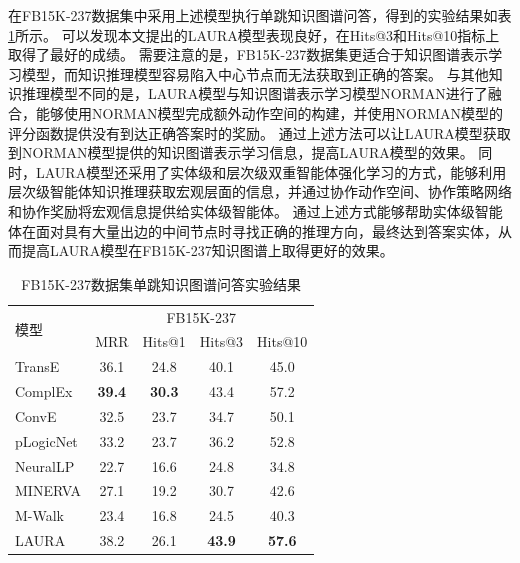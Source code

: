 \documentclass[algorithmlist, AutoFakeBold, AutoFakeSlant, figurelist, tablelist, nomlist, engineering]{seuthesix}
\begin{document}
在FB15K-237数据集中采用上述模型执行单跳知识图谱问答，得到的实验结果如表\ref{Experiment2_FB15K-237}所示。
可以发现本文提出的LAURA模型表现良好，在Hits@3和Hits@10指标上取得了最好的成绩。
需要注意的是，FB15K-237数据集更适合于知识图谱表示学习模型，而知识推理模型容易陷入中心节点而无法获取到正确的答案。
与其他知识推理模型不同的是，LAURA模型与知识图谱表示学习模型NORMAN进行了融合，能够使用NORMAN模型完成额外动作空间的构建，并使用NORMAN模型的评分函数提供没有到达正确答案时的奖励。
通过上述方法可以让LAURA模型获取到NORMAN模型提供的知识图谱表示学习信息，提高LAURA模型的效果。
同时，LAURA模型还采用了实体级和层次级双重智能体强化学习的方式，能够利用层次级智能体知识推理获取宏观层面的信息，并通过协作动作空间、协作策略网络和协作奖励将宏观信息提供给实体级智能体。
通过上述方式能够帮助实体级智能体在面对具有大量出边的中间节点时寻找正确的推理方向，最终达到答案实体，从而提高LAURA模型在FB15K-237知识图谱上取得更好的效果。
\begin{table}[]
  \centering
  \begin{tabular*}{0.95\textwidth}{@{\extracolsep{\fill}}lcccc}
  \toprule[1pt]
  \multirow{2}{*}{模型} & \multicolumn{4}{c}{FB15K-237}   \\
    & MRR & Hits@1 & Hits@3 & Hits@10 \\ \hline
  TransE & 36.1 & 24.8 & 40.1 & 45.0 \\
  ComplEx & \textbf{39.4} & \textbf{30.3} & 43.4 & 57.2 \\
  ConvE & 32.5 & 23.7 & 34.7 & 50.1 \\
  pLogicNet & 33.2 & 23.7 & 36.2 & 52.8 \\
  NeuralLP & 22.7 & 16.6 & 24.8 & 34.8 \\
  MINERVA & 27.1 & 19.2 & 30.7 & 42.6 \\
  M-Walk & 23.4 & 16.8 & 24.5 & 40.3 \\
  LAURA & 38.2 & 26.1 & \textbf{43.9} & \textbf{57.6} \\
  \bottomrule[1pt]
  \end{tabular*}
  \caption{FB15K-237数据集单跳知识图谱问答实验结果}
  \label{Experiment2_FB15K-237}
\end{table}
\end{document}
